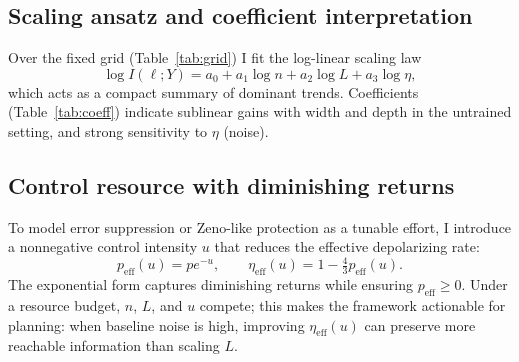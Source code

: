 \documentclass[journal]{IEEEtran}
\newcommand{\MI}{I(\ell;Y)}
\newcommand{\peff}{p_{\mathrm{eff}}(u)}
\newcommand{\etaeff}{\eta_{\mathrm{eff}}(u)}
\begin{document}
\subsection{Scaling ansatz and coefficient interpretation}
Over the fixed grid (Table~\ref{tab:grid}) I fit the log-linear scaling law
\begin{equation}
\log \MI = a_0 + a_1\log n + a_2\log L + a_3\log \eta,
\label{eq:scaling}
\end{equation}
which acts as a compact summary of dominant trends. Coefficients (Table~\ref{tab:coeff}) indicate sublinear gains with width and depth in the untrained setting, and strong sensitivity to $\eta$ (noise).

\subsection{Control resource with diminishing returns}
To model error suppression or Zeno-like protection \cite{ref17,ref18} as a tunable effort, I introduce a nonnegative control intensity $u$ that reduces the effective depolarizing rate:
\begin{equation}
\peff = p e^{-u},\qquad \etaeff = 1-\tfrac{4}{3}\peff.
\label{eq:control}
\end{equation}
The exponential form captures diminishing returns while ensuring $p_{\mathrm{eff}}\ge 0$. Under a resource budget, $n$, $L$, and $u$ compete; this makes the framework actionable for planning: when baseline noise is high, improving $\etaeff$ can preserve more reachable information than scaling $L$.
\end{document}
